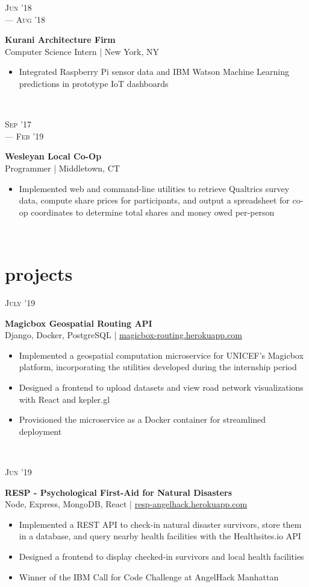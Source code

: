\documentclass[letterpaper, 10.5pt]{article}
\newcommand{\expentry}[5]{
    \begin{minipage}[t]{.15\linewidth}
    \hfill \textsc{#1} \\
    \hfill \hspace*{5pt}\hfill --- \textsc{#2}
    \end{minipage}
    \hfill\vline\hfill
    \begin{minipage}[t]{.80\linewidth}
    {\bf\large#3}
    \\ #4 
    \vspace{-1.5mm}
    \small{#5}
    \end{minipage}\\
    \vspace{.125cm}
    }
\newcommand{\projectentry}[4]{
    \begin{minipage}[t]{.15\linewidth}
    \hfill \textsc{#1}
    \end{minipage}
    \hfill\vline\hfill
    \begin{minipage}[t]{.80\linewidth}
    {\bf#2}
    \\ #3 
    \vspace{-1.0mm}
    \small{#4}
    \end{minipage}\\
    \vspace{.125cm}
    }
\begin{document}
    \expentry{Jun '18}
    {Aug '18}
    {Kurani Architecture Firm}
    {Computer Science Intern | New York, NY}
    {\begin{itemize}
          \setlength\itemsep{0.1mm}
          \item Integrated Raspberry Pi sensor data and IBM Watson Machine Learning predictions in prototype IoT dashboards
        \end{itemize}
    }

    \expentry{Sep '17}
    {Feb '19}
    {Wesleyan Local Co-Op}
    {Programmer | Middletown, CT}
    {\begin{itemize}
          \setlength\itemsep{0.1mm}
          \item Implemented web and command-line utilities to retrieve Qualtrics survey data, compute share prices for participants, and output a spreadsheet for co-op coordinates to determine total shares and money owed per-person
        \end{itemize}
    }

    \section{projects}

        \projectentry{July '19}
            {Magicbox Geospatial Routing API}
            {Django, Docker, PostgreSQL | \href{https://magicbox-routing.herokuapp.com}{magicbox-routing.herokuapp.com}}
            {\begin{itemize}
                \setlength\itemsep{0.1mm}
                \item Implemented a geospatial computation microservice for UNICEF's Magicbox platform, incorporating the utilities developed during the internship period
                \item Designed a frontend to upload datasets and view road network visualizations with React and kepler.gl
                \item Provisioned the microservice as a Docker container for streamlined deployment
            \end{itemize}
            }

        \projectentry{Jun '19}
            {RESP - Psychological First-Aid for Natural Disasters}
            {Node, Express, MongoDB, React | \href{https://resp-angelhack.herokuapp.com}{resp-angelhack.herokuapp.com}}
            {\begin{itemize}
                \setlength\itemsep{0.1mm}
                \item Implemented a REST API to check-in natural disaster survivors, store them in a database, and query nearby health facilities with the Healthsites.io API
                \item Designed a frontend  to display checked-in survivors and local health facilities
                \item Winner of the IBM Call for Code Challenge at AngelHack Manhattan
            \end{itemize}
            }
            
\end{document}

